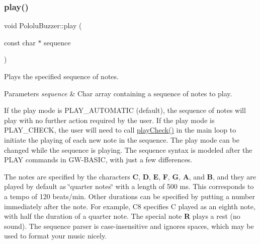 \subsubsection{\texorpdfstring{play()}{play()}}
{\footnotesize\ttfamily void Pololu\+Buzzer\+::play (\begin{DoxyParamCaption}\item[{const char $\ast$}]{sequence }\end{DoxyParamCaption})\hspace{0.3cm}{\ttfamily [static]}}



Plays the specified sequence of notes. 


\begin{DoxyParams}{Parameters}
{\em sequence} & Char array containing a sequence of notes to play.\\
\hline
\end{DoxyParams}
If the play mode is {\ttfamily P\+L\+A\+Y\+\_\+\+A\+U\+T\+O\+M\+A\+T\+IC} (default), the sequence of notes will play with no further action required by the user. If the play mode is {\ttfamily P\+L\+A\+Y\+\_\+\+C\+H\+E\+CK}, the user will need to call {\ttfamily \hyperlink{class_pololu_buzzer_a427225dcc85c1e65078e4397b9890929}{play\+Check()}} in the main loop to initiate the playing of each new note in the sequence. The play mode can be changed while the sequence is playing. The sequence syntax is modeled after the P\+L\+AY commands in G\+W-\/\+B\+A\+S\+IC, with just a few differences.

The notes are specified by the characters {\bfseries C}, {\bfseries D}, {\bfseries E}, {\bfseries F}, {\bfseries G}, {\bfseries A}, and {\bfseries B}, and they are played by default as \char`\"{}quarter notes\char`\"{} with a length of 500 ms. This corresponds to a tempo of 120 beats/min. Other durations can be specified by putting a number immediately after the note. For example, C8 specifies C played as an eighth note, with half the duration of a quarter note. The special note {\bfseries R} plays a rest (no sound). The sequence parser is case-\/insensitive and ignores spaces, which may be used to format your music nicely.


